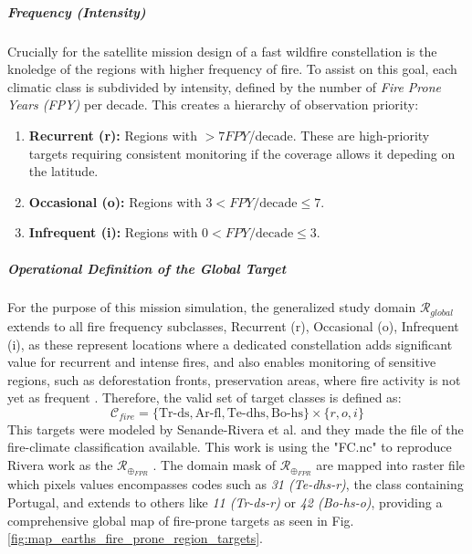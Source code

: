 \subparagraph{Frequency (Intensity)} \hspace{0pt}

Crucially for the satellite mission design of a fast wildfire constellation is the knoledge of the regions with higher frequency of fire. To assist on this goal, each climatic class is subdivided by intensity, defined by the number of \textit{Fire Prone Years (FPY)} per decade. This creates a hierarchy of observation priority:

\begin{enumerate}
    \item \textbf{Recurrent (r):} Regions with $> 7 FPY$/decade. These are high-priority targets requiring consistent monitoring if the coverage allows it depeding on the latitude.
    \item \textbf{Occasional (o):} Regions with $3 < FPY\text{/decade} \leq 7$.
    \item \textbf{Infrequent (i):} Regions with $0 < FPY\text{/decade} \leq 3$.
\end{enumerate}

\subparagraph{Operational Definition of the Global Target} \hspace{0pt}

For the purpose of this mission simulation, the generalized study domain $\mathcal{R}_{global}$ extends to all fire frequency subclasses, Recurrent (r), Occasional (o), Infrequent (i), as these represent locations where a dedicated constellation adds significant value for recurrent and intense fires, and also enables monitoring of sensitive regions, such as deforestation fronts, preservation areas, where fire activity is not yet as frequent .
Therefore, the valid set of target classes is defined as:
\begin{equation}
    \mathcal{C}_{fire} = \{ \text{Tr-ds}, \text{Ar-fl}, \text{Te-dhs}, \text{Bo-hs} \} \times \{ r, o, i \}
\end{equation}
This targets were modeled by Senande-Rivera et al. and they made the file of the fire-climate classification available. This work is using the "FC.nc" to reproduce Rivera work as the $\mathcal{R}_{\oplus_{FPR}}$  \cite{senanderivera_fireclimate_2022}. The domain mask of $\mathcal{R}_{\oplus_{FPR}}$ are mapped into raster file which pixels values encompasses codes such as \textit{31 (Te-dhs-r)}, the class containing Portugal, and extends to others like \textit{11 (Tr-ds-r)} or \textit{42 (Bo-hs-o)}, providing a comprehensive global map of fire-prone targets as seen in Fig. \ref{fig:map_earths_fire_prone_region_targets}.

